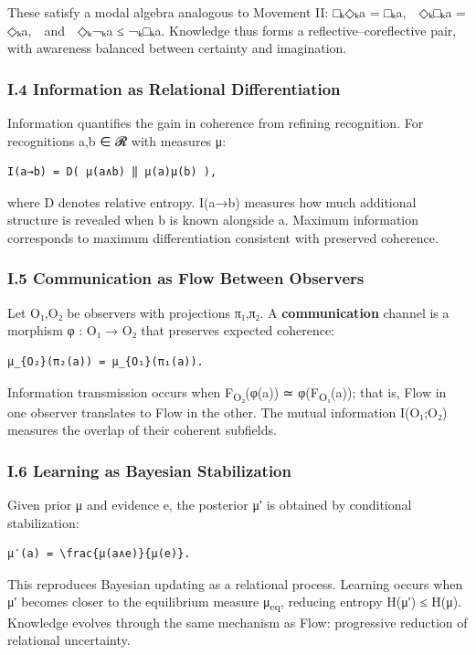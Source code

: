 \documentclass[11pt]{article}
\begin{document}
These satisfy a modal algebra analogous to Movement II:  
□ₖ◇ₖa = □ₖa, ◇ₖ□ₖa = ◇ₖa, and ◇ₖ¬ₖa ≤ ¬ₖ□ₖa.  
Knowledge thus forms a reflective–coreflective pair,  
with awareness balanced between certainty and imagination.
\subsubsection*{I.4 Information as Relational Differentiation}
\label{sec:org6470b4b}
Information quantifies the gain in coherence from refining recognition.  
For recognitions a,b ∈ 𝓡 with measures μ:

\begin{verbatim}
I(a→b) = D( μ(a∧b) ‖ μ(a)μ(b) ),
\end{verbatim}

where D denotes relative entropy.  
I(a→b) measures how much additional structure is revealed  
when b is known alongside a.  
Maximum information corresponds to maximum differentiation  
consistent with preserved coherence.
\subsubsection*{I.5 Communication as Flow Between Observers}
\label{sec:org1a6a51d}
Let O₁,O₂ be observers with projections π₁,π₂.  
A \textbf{communication} channel is a morphism φ : O₁ → O₂  
that preserves expected coherence:

\begin{verbatim}
μ_{O₂}(π₂(a)) = μ_{O₁}(π₁(a)).
\end{verbatim}

Information transmission occurs when  
F\textsubscript{O₂}(φ(a)) ≃ φ(F\textsubscript{O₁}(a));  
that is, Flow in one observer translates to Flow in the other.  
The mutual information I(O₁;O₂) measures  
the overlap of their coherent subfields.
\subsubsection*{I.6 Learning as Bayesian Stabilization}
\label{sec:orgaf8eb6e}
Given prior μ and evidence e,  
the posterior μ′ is obtained by conditional stabilization:

\begin{verbatim}
μ′(a) = \frac{μ(a∧e)}{μ(e)}.
\end{verbatim}

This reproduces Bayesian updating as a relational process.  
Learning occurs when μ′ becomes closer to the equilibrium measure μ\textsubscript{eq},  
reducing entropy H(μ′) ≤ H(μ).  
Knowledge evolves through the same mechanism as Flow:  
progressive reduction of relational uncertainty.
\end{document}
